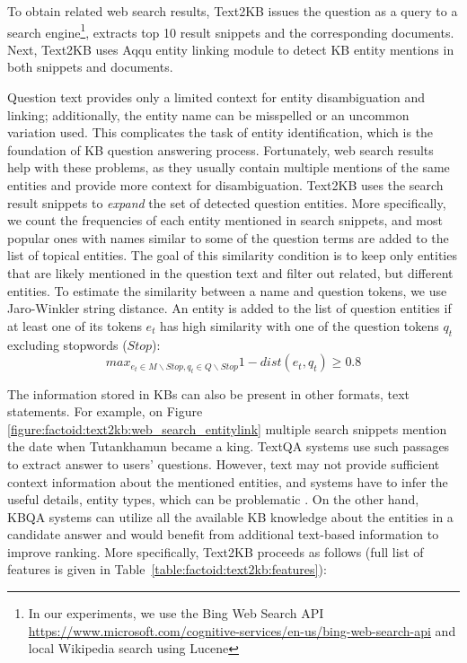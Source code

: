 To obtain related web search results, Text2KB issues the question as a query to a search engine\footnote{In our experiments, we use the Bing Web Search API \href{url}{https://www.microsoft.com/cognitive-services/en-us/bing-web-search-api} and local Wikipedia search using Lucene}, extracts top 10 result snippets and the corresponding documents.
Next, Text2KB uses Aqqu entity linking module to detect KB entity mentions in both snippets and documents.

Question text provides only a limited context for entity disambiguation and linking; additionally, the entity name can be misspelled or an uncommon variation used.
This complicates the task of entity identification, which is the foundation of KB question answering process.
Fortunately, web search results help with these problems, as they usually contain multiple mentions of the same entities and provide more context for disambiguation.
Text2KB uses the search result snippets to \textit{expand} the set of detected question entities.
More specifically, we count the frequencies of each entity mentioned in search snippets, and most popular ones with names similar to some of the question terms are added to the list of topical entities.
The goal of this similarity condition is to keep only entities that are likely mentioned in the question text and filter out related, but different entities.
To estimate the similarity between a name and question tokens, we use Jaro-Winkler string distance.
An entity is added to the list of question entities if at least one of its tokens $e_t$ has high similarity with one of the question tokens $q_t$ excluding stopwords ($Stop$):
$$max_{e_t \in M \backslash Stop, q_t \in Q \backslash Stop} 1 - dist(e_t, q_t) \geq 0.8$$

The information stored in KBs can also be present in other formats, \eg text statements.
For example, on Figure \ref{figure:factoid:text2kb:web_search_entitylink} multiple search snippets mention the date when Tutankhamun became a king.
TextQA systems use such passages to extract answer to users' questions.
However, text may not provide sufficient context information about the mentioned entities, and systems have to infer the useful details, \eg entity types, which can be problematic \cite{yih2014semantic}.
On the other hand, KBQA systems can utilize all the available KB knowledge about the entities in a candidate answer and would benefit from additional text-based information to improve ranking.
More specifically, Text2KB proceeds as follows (full list of features is given in Table~\ref{table:factoid:text2kb:features}):

